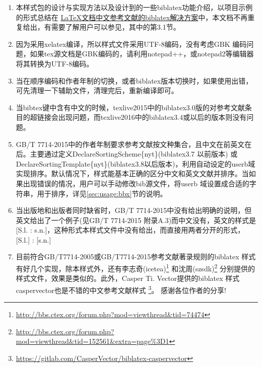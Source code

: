 \begin{enumerate}
  \item 本样式包的设计与实现方法以及设计到的一些biblatex功能介绍，以项目示例的形式总结在
  \href{https://github.com/hushidong/biblatex-solution-to-latex-bibliography}{\LaTeX 文档中文参考文献的biblatex解决方案}中，本文档不再重复给出，有需要了解用户可以参见，其中的第3.1节。

  \item 因为采用xelatex编译，所以样式文件采用UTF-8编码，没有考虑GBK 编码问题，如果tex源文档是GBK编码的，请利用notepad++，或notepad2等编辑器将其转换为UTF-8编码。

  \item 当在顺序编码和作者年制的切换，或者biblatex版本切换时，如果使用出错，可先清理一下辅助文件，清理完后，重新编译即可。

  \item 当bibtex键中含有中文的时候，texlive2015中的biblatex3.0版的对参考文献条目的超链接会出现问题，而texlive2016中的biblatex3.4或以后的版本则没有问题。

  \item GB/T 7714-2015中的作者年制要求参考文献按文种集合，且中文在前英文在后。主要通过定义DeclareSortingScheme\{nyt\}(biblatex3.7 以前版本) 或DeclareSortingTemplate\{nyt\}(biblatex3.8以后版本)，利用自动设定的userb域实现排序。默认情况下，样式能基本正确的区分中文和英文文献并排序。当如果出现错误的情况，用户可以手动修改bib源文件，将userb 域设置成合适的字符串，用于排序，详见\ref{sec:usage:bbx}节的说明。


  \item 当出版地和出版者同时缺省时，GB/T 7714-2015中没有给出明确的说明，但英文给出了一个例子(见GB/T 7714-2015 附录A.3)而中文没有，英文的样式是[S.l. : s.n.]，这种形式本样式文件中没有给出，而直接用两者分开的形式，[S.l.] : [s.n.]


  \item 目前符合GB/T7714-2005或GB/T7714-2015参考文献著录规则的biblatex 样式有好几个实现，除本样式外，还有李志奇(icetea)\footnote{\url{http://bbs.ctex.org/forum.php?mod=viewthread&tid=74474}} 和沈周(szsdk)\footnote{\url{http://bbs.ctex.org/forum.php?mod=viewthread&tid=152561&extra=page\%3D1}} 分别提供的样式文件，效果是类似的。此外，Casper Ti. Vector提供的biblatex 样式caspervector也是不错的中文参考文献样式
      \footnote{\url{https://gitlab.com/CasperVector/biblatex-caspervector}}。 感谢各位作者的分享!


\end{enumerate}
